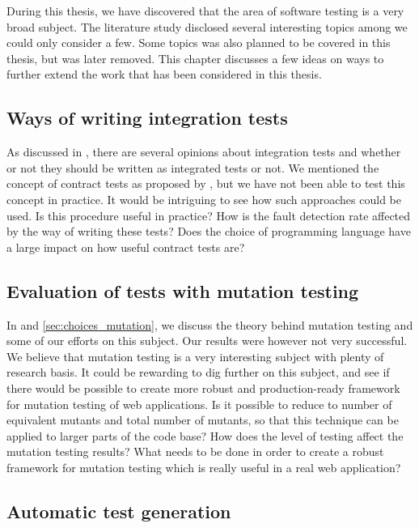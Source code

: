 
During this thesis, we have discovered that the area of software testing
is a very broad subject. The literature study disclosed several
interesting topics among we could only consider a few. Some topics was
also planned to be covered in this thesis, but was later removed. This
chapter discusses a few ideas on ways to further extend the work that
has been considered in this thesis.\\


\subsection{Ways of writing integration tests}

As discussed in , there are several
opinions about integration tests and whether or not they should be
written as  integrated tests or not. We mentioned the concept of
contract tests as proposed by \citet{video:integrated_scam}, but we have
not been able to test this concept in practice. It would be intriguing
to see how such approaches could be used. Is this procedure useful in
practice? How is the fault detection rate affected by the way of writing
these tests? Does the choice of programming language have a large impact
on how useful contract tests are?\\


\subsection{Evaluation of tests with mutation testing}

In  and \ref{sec:choices_mutation}, we discuss
the theory behind mutation testing and some of our efforts on this
subject. Our results were however not very successful. We believe that
mutation testing is a very interesting subject with plenty of research
basis. It could be rewarding to dig further on this subject, and see if
there would be possible to create more robust and production-ready
framework for mutation testing of web applications. Is it possible to
reduce to number of equivalent mutants and total number of mutants, so
that  this technique can be applied to larger parts of the code base?
How does the level of testing affect the mutation testing results? What
needs to be done in order to create a robust framework for mutation
testing which is really useful in a real web application?\\


\subsection{Automatic test generation}

